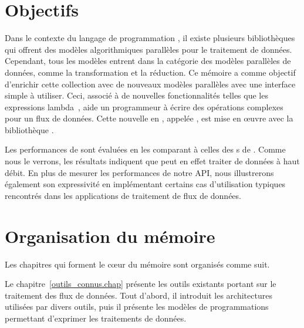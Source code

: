 \begin{introduction}
\section*{Objectifs}


Dans le contexte du langage de programmation , il existe plusieurs biblioth\`eques qui offrent des mod\`eles algorithmiques parall\`eles pour le traitement de donn\'ees. Cependant, tous les mod\`eles entrent dans la cat\'egorie des mod\`eles parall\`eles de donn\'ees, comme la transformation et la r\'eduction. Ce m\'emoire a comme objectif d'enrichir cette collection avec de nouveaux mod\`eles parall\`eles avec une interface simple \`a utiliser. Ceci, associ\'e \`a de nouvelles fonctionnalit\'es telles que les expressions lambda~\citep{josuttis2012c++}, aide un programmeur \`a \'ecrire des op\'erations complexes pour un flux de donn\'ees. Cette nouvelle  en , appel\'ee ,  est mise en \oe{}uvre avec la biblioth\`eque .

Les performances de  sont \'evalu\'ees en les comparant \`a celles des s de . Comme nous le verrons, les r\'esultats indiquent que  peut en effet traiter de donn\'ees \`a haut d\'ebit. En plus de mesurer les performances de notre API, nous illustrerons \'egalement son expressivit\'e en impl\'ementant certains cas d'utilisation typiques rencontr\'es dans les applications de traitement de flux de donn\'ees.


\section*{Organisation du m\'emoire}

Les chapitres qui forment le c\oe{}ur du m\'emoire sont organis\'es
comme suit.



Le chapitre~\ref{outils_connus.chap}  pr\'esente les outils existants portant sur le traitement des flux de donn\'ees.  Tout d'abord, il introduit les architectures utilis\'ees par divers outils, puis il pr\'esente les mod\`eles de programmations permettant d'exprimer les traitements de donn\'ees.


\end{introduction}
